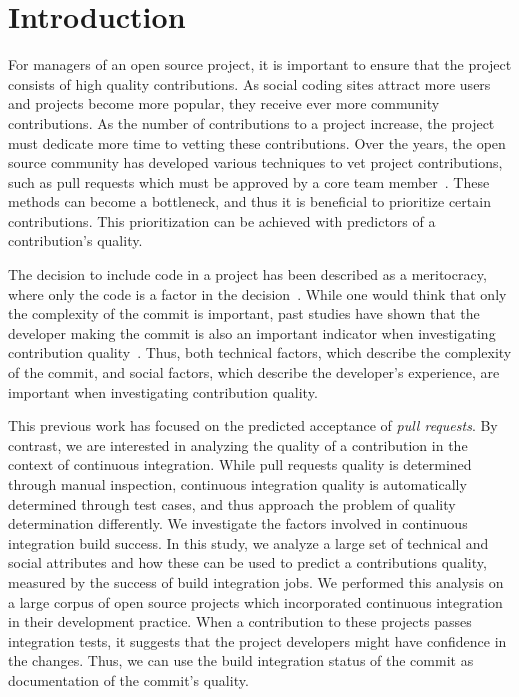 \documentclass[10pt, conference]{IEEEtran}
\begin{document}
\section{Introduction}
For managers of an open source project, it is important to ensure that the
project consists of high quality contributions.  As social coding sites attract
more users and projects become more popular, they receive ever more
community contributions.  As the number of contributions to a project increase,
the project must dedicate more time to vetting these contributions. 
%
Over the years, the open source
community has developed various techniques to vet project contributions, such as pull
requests which must be approved by a core team member~\cite{gousios14}. 
These methods can become a bottleneck, and thus it is beneficial to prioritize certain
contributions.  This prioritization can be achieved with predictors of a
contribution's quality.

The decision to include code in
a project has been described as a meritocracy, where only the code is a factor
in the decision~\cite{Scacchi07}.
While one would think that only the complexity of the commit is important, past
studies have shown that the developer making the commit is also an important
indicator when investigating contribution quality~\cite{tsay14icse, tasy14fse}.
Thus, both technical factors, which describe the complexity of the commit, and
social factors, which describe the developer's experience, are important when
investigating contribution quality.

This previous work has focused on the predicted acceptance of \emph{pull requests}. 
By contrast,  we are interested in analyzing the quality 
of a contribution in the context of continuous integration.  While pull requests
quality is determined through manual inspection, continuous integration quality
is automatically determined through test cases, and thus approach the problem of
quality determination differently.
We investigate the factors involved in continuous integration build success.
In this study, we analyze a large set of technical and social attributes 
and how these can be used to predict a contributions quality, measured by the
success of build integration jobs.
We performed this analysis on a large corpus of open source projects
which incorporated continuous integration in their development practice. 
When a contribution to these projects passes integration tests, 
it suggests that the project developers
might have confidence in the changes. 
Thus, we can use the build integration status of the commit as documentation of
the commit's quality.
\end{document}
